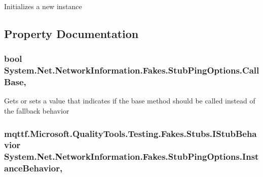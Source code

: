 Initializes a new instance



\subsection{Property Documentation}
\hypertarget{class_system_1_1_net_1_1_network_information_1_1_fakes_1_1_stub_ping_options_a753ee95d038aa25d650a93c1e21f295d}{
\subsubsection[{Call\-Base}]{\setlength{\rightskip}{0pt plus 5cm}bool System.\-Net.\-Network\-Information.\-Fakes.\-Stub\-Ping\-Options.\-Call\-Base\hspace{0.3cm}{\ttfamily [get]}, {\ttfamily [set]}}}\label{class_system_1_1_net_1_1_network_information_1_1_fakes_1_1_stub_ping_options_a753ee95d038aa25d650a93c1e21f295d}


Gets or sets a value that indicates if the base method should be called instead of the fallback behavior

\hypertarget{class_system_1_1_net_1_1_network_information_1_1_fakes_1_1_stub_ping_options_add5438dbeac2044ff17915254201f881}{
\subsubsection[{Instance\-Behavior}]{\setlength{\rightskip}{0pt plus 5cm}mqttf.\-Microsoft.\-Quality\-Tools.\-Testing.\-Fakes.\-Stubs.\-I\-Stub\-Behavior System.\-Net.\-Network\-Information.\-Fakes.\-Stub\-Ping\-Options.\-Instance\-Behavior\hspace{0.3cm}{\ttfamily [get]}, {\ttfamily [set]}}}\label{class_system_1_1_net_1_1_network_information_1_1_fakes_1_1_stub_ping_options_add5438dbeac2044ff17915254201f881}


